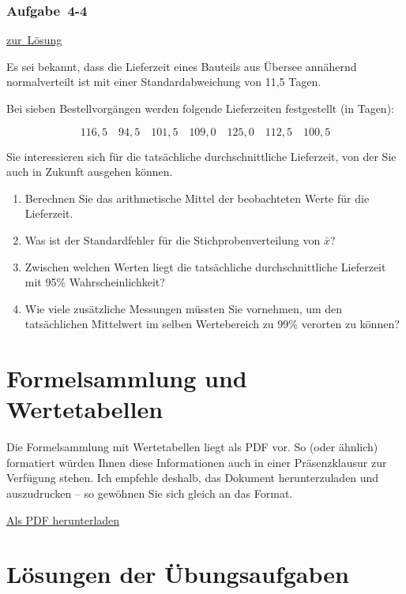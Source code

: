 \documentclass[
  11pt,
  ngerman,
  a4paper,
]{report}
\providecommand{\tightlist}{%
  \setlength{\itemsep}{0pt}\setlength{\parskip}{0pt}}
\begin{document}
\hypertarget{aufgabe-4-4}{%
\subsection{Aufgabe~4-4}\label{aufgabe-4-4}}

\protect\hyperlink{loesung-4-4}{zur~Lösung}

Es sei bekannt, dass die Lieferzeit eines Bauteils aus Übersee annähernd normalverteilt ist mit einer Standardabweichung von 11,5 Tagen.

Bei sieben Bestellvorgängen werden folgende Lieferzeiten festgestellt (in Tagen):

\[116{,}5\quad 94{,}5\quad101{,}5\quad109{,}0\quad125{,}0\quad112{,}5\quad100{,}5\]

Sie interessieren sich für die tatsächliche durchschnittliche Lieferzeit, von der Sie auch in Zukunft ausgehen können.

\begin{enumerate}
\def\labelenumi{\alph{enumi})}
\tightlist
\item
  Berechnen Sie das arithmetische Mittel der beobachteten Werte für die Lieferzeit.
\item
  Was ist der Standardfehler für die Stichprobenverteilung von \(\bar{x}\)?
\item
  Zwischen welchen Werten liegt die tatsächliche durchschnittliche Lieferzeit mit 95\% Wahrscheinlichkeit?
\item
  Wie viele zusätzliche Messungen müssten Sie vornehmen, um den tatsächlichen Mittelwert im selben Wertebereich zu 99\% verorten zu können?
\end{enumerate}

\hypertarget{formeln}{%
\chapter*{Formelsammlung und Wertetabellen}\label{formeln}}

Die Formelsammlung mit Wertetabellen liegt als PDF vor. So (oder ähnlich) formatiert würden Ihnen diese Informationen auch in einer Präsenzklausur zur Verfügung stehen. Ich empfehle deshalb, das Dokument herunterzuladen und auszudrucken -- so gewöhnen Sie sich gleich an das Format.

\href{Formelsammlung\%20und\%20Wertetabellen.pdf}{Als PDF herunterladen}

\hypertarget{luxf6sungen-der-uxfcbungsaufgaben}{%
\chapter*{Lösungen der Übungsaufgaben}\label{luxf6sungen-der-uxfcbungsaufgaben}}
\end{document}
